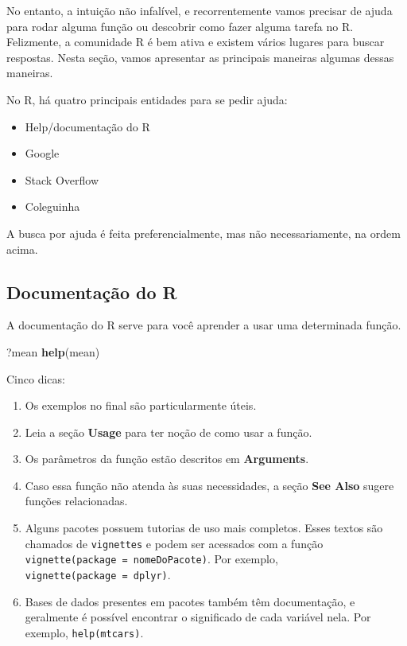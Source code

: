 \documentclass[]{book}
\newenvironment{Shaded}{\begin{snugshade}}{\end{snugshade}}
\newcommand{\KeywordTok}[1]{\textcolor[rgb]{0.13,0.29,0.53}{\textbf{#1}}}
\newcommand{\NormalTok}[1]{#1}
\providecommand{\tightlist}{%
  \setlength{\itemsep}{0pt}\setlength{\parskip}{0pt}}
\begin{document}
No entanto, a intuição não infalível, e recorrentemente vamos precisar de ajuda para rodar alguma função ou descobrir como fazer alguma tarefa no R. Felizmente, a comunidade R é bem ativa e existem vários lugares para buscar respostas. Nesta seção, vamos apresentar as principais maneiras algumas dessas maneiras.

No R, há quatro principais entidades para se pedir ajuda:

\begin{itemize}
\tightlist
\item
  Help/documentação do R
\item
  Google
\item
  Stack Overflow
\item
  Coleguinha
\end{itemize}

A busca por ajuda é feita preferencialmente, mas não necessariamente, na ordem acima.

\hypertarget{documentauxe7uxe3o-do-r}{%
\subsection{Documentação do R}\label{documentauxe7uxe3o-do-r}}

A documentação do R serve para você aprender a usar uma determinada função.

\begin{Shaded}
\begin{Highlighting}[]
\NormalTok{?mean}
\KeywordTok{help}\NormalTok{(mean)}
\end{Highlighting}
\end{Shaded}

Cinco dicas:

\begin{enumerate}
\def\labelenumi{\arabic{enumi}.}
\tightlist
\item
  Os exemplos no final são particularmente úteis.
\item
  Leia a seção \textbf{Usage} para ter noção de como usar a função.
\item
  Os parâmetros da função estão descritos em \textbf{Arguments}.
\item
  Caso essa função não atenda às suas necessidades, a seção \textbf{See Also} sugere funções relacionadas.
\item
  Alguns pacotes possuem tutorias de uso mais completos. Esses textos são chamados de \texttt{vignettes} e podem ser acessados com a função \texttt{vignette(package\ =\ \textquotesingle{}nomeDoPacote\textquotesingle{})}. Por exemplo, \texttt{vignette(package\ =\ \textquotesingle{}dplyr\textquotesingle{})}.
\item
  Bases de dados presentes em pacotes também têm documentação, e geralmente é possível encontrar o significado de cada variável nela. Por exemplo, \texttt{help(mtcars)}.
\end{enumerate}
\end{document}
